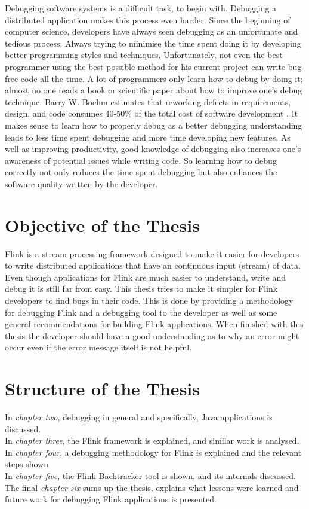 Debugging software systems is a difficult task, to begin with. Debugging a distributed application makes this process even harder. Since the beginning of computer science, developers have always seen debugging as an unfortunate and tedious process. Always trying to minimise the time spent doing it by developing better programming styles and techniques. Unfortunately, not even the best programmer using the best possible method for his current project can write bug-free code all the time. A lot of programmers only learn how to debug by doing it; almost no one reads a book or scientific paper about how to improve one's debug technique. Barry W. Boehm estimates that reworking defects in requirements, design, and code consumes 40-50\% of the total cost of software development \cite{1663694}. It makes sense to learn how to properly debug as a better debugging understanding leads to less time spent debugging and more time developing new features. As well as improving productivity, good knowledge of debugging also increases one's awareness of potential issues while writing code. So learning how to debug correctly not only reduces the time spent debugging but also enhances the software quality written by the developer.

\section{Objective of the Thesis}
Flink is a stream processing framework designed to make it easier for developers to write distributed applications that have an continuous input (stream) of data. Even though applications for Flink are much easier to understand, write and debug it is still far from easy. This thesis tries to make it simpler for Flink developers to find bugs in their code. This is done by providing a methodology for debugging Flink and a debugging tool to the developer as well as some general recommendations for building Flink applications. When finished with this thesis the developer should have a good understanding as to why an error might occur even if the error message itself is not helpful.

\pagebreak

\section{Structure of the Thesis}
In \emph{chapter two}, debugging in general and specifically, Java applications is discussed.\\
In \emph{chapter three}, the Flink framework is explained, and similar work is analysed.\\
In \emph{chapter four}, a debugging methodology for Flink is explained and the relevant steps shown\\
In \emph{chapter five}, the Flink Backtracker tool is shown, and its internals discussed.\\
The final \emph{chapter six} sums up the thesis, explains what lessons were learned and future work for debugging Flink applications is presented.
